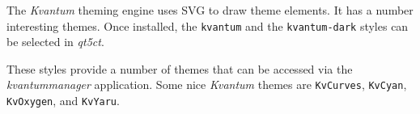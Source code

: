    The \textsl{Kvantum} theming engine uses SVG to draw theme elements.
   It has a number interesting themes. Once installed,
   the \texttt{kvantum} and
   the \texttt{kvantum-dark}
   styles can be selected in \textsl{qt5ct}.

   These styles provide a number of themes that can be
   accessed via the \textsl{kvantummanager} application.
   Some nice \textsl{Kvantum} themes are \texttt{KvCurves},
   \texttt{KvCyan},
   \texttt{KvOxygen}, and
   \texttt{KvYaru}.


